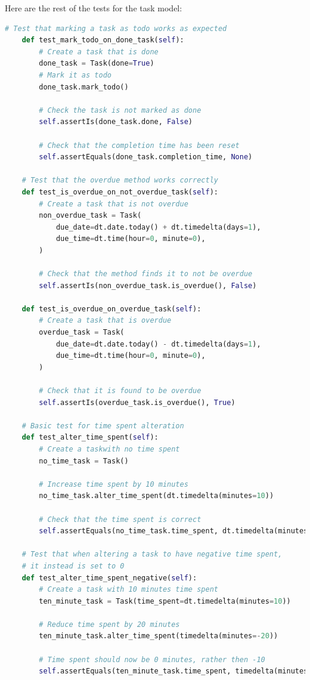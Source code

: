 \documentclass{article}
\begin{document}
Here are the rest of the tests for the task model:
\begin{lstlisting}[language=Python]
    # Test that marking a task as todo works as expected
    def test_mark_todo_on_done_task(self):
        # Create a task that is done
        done_task = Task(done=True)
        # Mark it as todo
        done_task.mark_todo()

        # Check the task is not marked as done
        self.assertIs(done_task.done, False)

        # Check that the completion time has been reset
        self.assertEquals(done_task.completion_time, None)

    # Test that the overdue method works correctly
    def test_is_overdue_on_not_overdue_task(self):
        # Create a task that is not overdue
        non_overdue_task = Task(
            due_date=dt.date.today() + dt.timedelta(days=1),
            due_time=dt.time(hour=0, minute=0),
        )

        # Check that the method finds it to not be overdue
        self.assertIs(non_overdue_task.is_overdue(), False)

    def test_is_overdue_on_overdue_task(self):
        # Create a task that is overdue
        overdue_task = Task(
            due_date=dt.date.today() - dt.timedelta(days=1),
            due_time=dt.time(hour=0, minute=0),
        )

        # Check that it is found to be overdue
        self.assertIs(overdue_task.is_overdue(), True)

    # Basic test for time spent alteration
    def test_alter_time_spent(self):
        # Create a taskwith no time spent
        no_time_task = Task()

        # Increase time spent by 10 minutes
        no_time_task.alter_time_spent(dt.timedelta(minutes=10))

        # Check that the time spent is correct
        self.assertEquals(no_time_task.time_spent, dt.timedelta(minutes=10))

    # Test that when altering a task to have negative time spent,
    # it instead is set to 0
    def test_alter_time_spent_negative(self):
        # Create a task with 10 minutes time spent
        ten_minute_task = Task(time_spent=dt.timedelta(minutes=10))

        # Reduce time spent by 20 minutes
        ten_minute_task.alter_time_spent(timedelta(minutes=-20))

        # Time spent should now be 0 minutes, rather then -10
        self.assertEquals(ten_minute_task.time_spent, timedelta(minutes=0))
\end{lstlisting}
\end{document}
